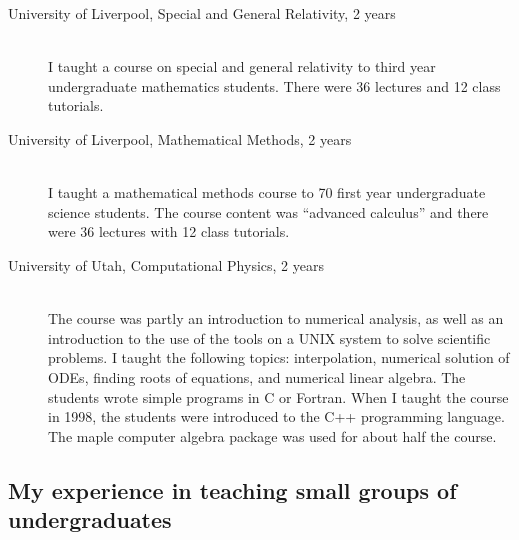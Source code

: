 \documentclass[12pt]{article}
\begin{document}
\begin{description}
  \item[University of Liverpool, Special and General
Relativity,
2 years] \hfill \\
I taught a course on special and general
relativity to third year undergraduate mathematics students. 
There were 36 lectures and 12 class tutorials.

  \item[University of Liverpool, Mathematical Methods, 2 years] \hfill \\
I taught a mathematical methods course
 to 70 first year undergraduate science students.  The course
content was ``advanced calculus'' and there were 36 lectures 
with 12 class tutorials.


\item[University of Utah, Computational Physics, 2 years] \hfill \\


The course was partly an introduction to numerical
analysis, as well as an introduction to the use of the tools on a UNIX
system to solve scientific problems.  I taught the following topics:
interpolation, numerical solution of ODEs, finding roots of
equations, and numerical linear algebra.  The students wrote simple
programs in C or Fortran. When I taught the course in 1998, the
students were introduced to the C++ programming language. The maple
computer algebra package was used for about half the course.


\end{description}

\subsection{My experience in teaching small groups of undergraduates}
\end{document}
